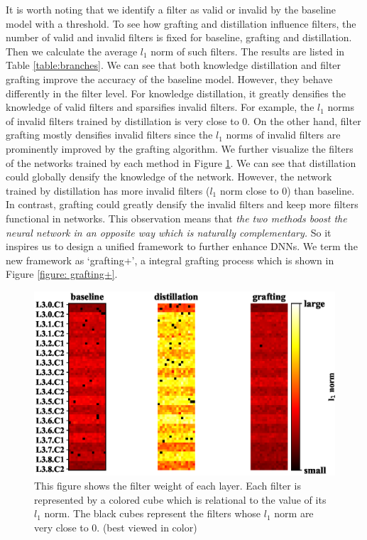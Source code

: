 \documentclass{article}
\begin{document}
It is worth noting that we identify a filter as valid or invalid by the baseline model with a threshold. To see how grafting and distillation influence filters, the number of valid and invalid filters is fixed for baseline, grafting and distillation. Then we calculate the average $l_{1}$ norm of such filters. The results are listed in Table \ref{table:branches}. We can see that both knowledge distillation and filter grafting improve the accuracy of the baseline model. However, they behave differently in the filter level. For knowledge distillation, it greatly densifies the knowledge of valid filters and sparsifies invalid filters. For example, the $l_{1}$ norms of invalid filters trained by distillation is very close to 0. On the other hand, filter grafting mostly densifies invalid filters since the $l_{1}$ norms of invalid filters are prominently improved by the grafting algorithm. We further visualize the filters of the networks trained by each method in Figure \ref{figure:bgd}. We can see that distillation could globally densify the knowledge of the network. However, the network trained by distillation has more invalid filters ($l_{1}$ norm close to 0) than baseline. In contrast, grafting could greatly densify the invalid filters and keep more filters functional in networks.  This observation means that \emph{the two methods boost the neural network in an opposite way which is naturally complementary.} So it inspires us to design a unified framework to further enhance DNNs. We term the new framework as `grafting+', a integral grafting process which is shown in Figure \ref{figure: grafting+}.



\begin{figure}[!h]
	\centering
	\includegraphics[width=15cm,]{fig/norm1.eps}
	\caption{This figure shows the filter weight of each layer. Each filter is represented by a colored cube which is relational to the value of its $l_{1}$ norm. The black cubes represent the filters whose $l_{1}$ norm are very close to 0.  (best viewed in color)}
	\label{figure:bgd}
\end{figure}
\end{document}
